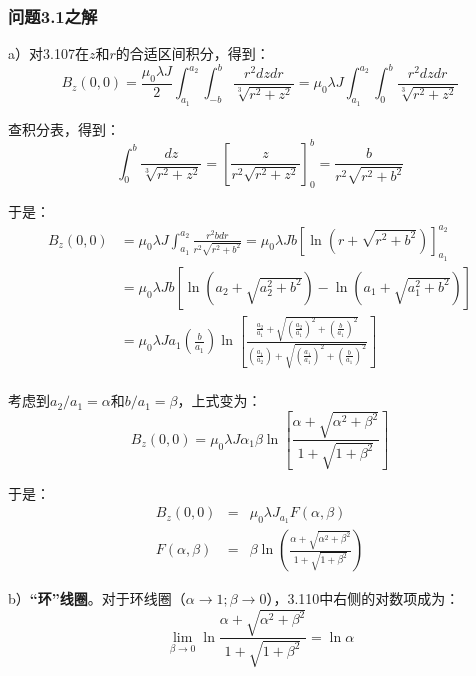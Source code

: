 \subsubsection{问题3.1之解}

a）对3.107在$z$和$r$的合适区间积分，得到：
\begin{equation}
B_z(0,0)=\frac{\mu_0\lambda J}{2}\int_{a_1}^{a_2}\int_{-b}^{b}\frac{r^2dzdr}{\sqrt[3]{r^2+z^2}}=\mu_0\lambda J\int_{a_1}^{a_2}\int_{0}^{b}\frac{r^2dzdr}{\sqrt[3]{r^2+z^2}}%
\end{equation}

查积分表，得到：
\begin{equation}
\int_{0}^{b}\frac{dz}{\sqrt[3]{r^2+z^2}}=\left[\frac{z}{r^2\sqrt{r^2+z^2}}\right]_{0}^{b}=\frac{b}{r^2\sqrt{r^2+b^2}}%
\end{equation}

于是：
\begin{equation}
\begin{split}
B_z(0,0)&=\mu_0\lambda J\int_{a_1}^{a_2}\frac{r^2bdr}{r^2\sqrt{r^2+b^2}}=\mu_0\lambda Jb[\ln({r+\sqrt{r^2+b^2}})]_{a_1}^{a_2}\\
&=\mu_0\lambda Jb[\ln(a_2+\sqrt{a_2^2+b^2})-\ln(a_1+\sqrt{a_1^2+b^2})]\\
&=\mu_0\lambda Ja_1(\frac{b}{a_1})\ln[\frac{\frac{a_2}{a_1}+\sqrt{(\frac{a_2}{a_1})^2+(\frac{b}{a_1})^2}}{(\frac{a_1}{a_2})+\sqrt{(\frac{a_1}{a_1})^2+(\frac{b}{a_1})^2}}]\\%
\end{split}
\end{equation}

考虑到$a_2/a_1=\alpha$和$b/a_1=\beta$，上式变为：
\begin{equation}
B_z(0,0)=\mu_0\lambda J\alpha_1\beta\ln\left[\frac{\alpha+\sqrt{\alpha^2+\beta^2}}{1+\sqrt{1+\beta^2}}\right]%
\end{equation}

于是：
\begin{eqnarray}
B_z(0,0)&=&\mu_0\lambda J_{a_1}F(\alpha,\beta)\\ %
F(\alpha,\beta)&=&\beta \ln(\frac{\alpha+\sqrt{\alpha^2+\beta^2}}{1+\sqrt{1+\beta^2}})%
\end{eqnarray}

b）\textbf{“环”线圈}。对于环线圈（$\alpha\rightarrow 1; \beta\rightarrow 0$），3.110中右侧的对数项成为：
\begin{equation}
\lim_{\beta\rightarrow 0}\ln\frac{\alpha+\sqrt{\alpha^2+\beta^2}}{1+\sqrt{1+\beta^2}}=\ln\alpha%
\end{equation}

